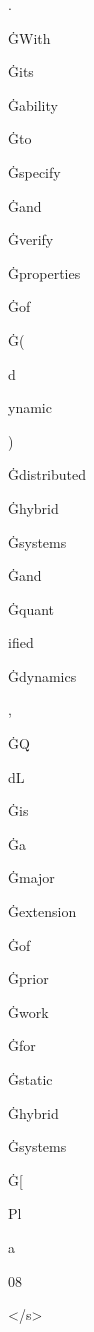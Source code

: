 \documentclass[varwidth]{standalone}
\begin{document}
\begin{CJK*}{UTF8}{gbsn}
{{{\colorbox{red!2.6820836}{\strut .} \colorbox{red!0.32028815}{\strut ĠWith} \colorbox{red!0.42112395}{\strut Ġits} \colorbox{red!0.25732446}{\strut Ġability} \colorbox{red!0.13028973}{\strut Ġto} \colorbox{red!0.37738866}{\strut Ġspecify} \colorbox{red!0.12584214}{\strut Ġand} \colorbox{red!0.43183514}{\strut Ġverify} \colorbox{red!0.166198}{\strut Ġproperties} \colorbox{red!0.14033511}{\strut Ġof} \colorbox{red!0.15348889}{\strut Ġ(} \colorbox{red!0.0}{\strut d} \colorbox{red!0.10427427}{\strut ynamic} \colorbox{red!0.103242815}{\strut )} \colorbox{red!0.19844505}{\strut Ġdistributed} \colorbox{red!0.19451441}{\strut Ġhybrid} \colorbox{red!0.079466924}{\strut Ġsystems} \colorbox{red!0.20202613}{\strut Ġand} \colorbox{red!0.08429146}{\strut Ġquant} \colorbox{red!0.016038688}{\strut ified} \colorbox{red!0.08652882}{\strut Ġdynamics} \colorbox{red!0.33029324}{\strut ,} \colorbox{red!0.052588053}{\strut ĠQ} \colorbox{red!0.1341364}{\strut dL} \colorbox{red!0.24579535}{\strut Ġis} \colorbox{red!0.1765098}{\strut Ġa} \colorbox{red!0.18784288}{\strut Ġmajor} \colorbox{red!0.17686361}{\strut Ġextension} \colorbox{red!0.108811736}{\strut Ġof} \colorbox{red!0.35721022}{\strut Ġprior} \colorbox{red!0.49781403}{\strut Ġwork} \colorbox{red!0.20705394}{\strut Ġfor} \colorbox{red!0.14018707}{\strut Ġstatic} \colorbox{red!0.15825997}{\strut Ġhybrid} \colorbox{red!0.06476284}{\strut Ġsystems} \colorbox{red!0.18360679}{\strut Ġ[} \colorbox{red!0.046093386}{\strut Pl} \colorbox{red!0.03680232}{\strut a} \colorbox{red!0.12186904}{\strut 08} \colorbox{red!0.31790644}{\strut </s>} 
}}}
\end{CJK*}
\end{document}
